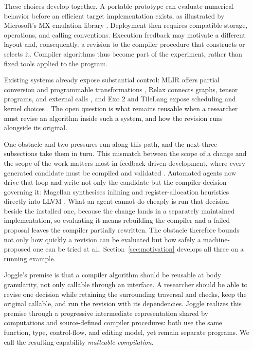 \documentclass[sigplan,anonymous,review]{acmart}
\begin{document}
These choices develop together. A portable prototype can evaluate numerical
behavior before an efficient target implementation exists, as illustrated by
Microsoft's MX emulation library \cite{microsoftMicroxcaling}. Deployment then
requires compatible storage, operations, and calling conventions. Execution
feedback may motivate a different layout and, consequently, a revision to the
compiler procedure that constructs or selects it. Compiler algorithms thus
become part of the experiment, rather than fixed tools applied to the program.

Existing systems already expose substantial control: MLIR offers partial
conversion and programmable transformations
\cite{mlirConversionDocs,lucke2025transform}, Relax connects graphs, tensor
programs, and external calls \cite{lai2025relax}, and Exo 2 and TileLang expose
scheduling and kernel choices \cite{ikarashi2024exo2,wang2025tilelang}. The
open question is what remains reusable when a researcher must revise an
algorithm inside such a system, and how the revision runs alongside its
original.

One obstacle and two pressures run along this path, and the next three
subsections take them in turn. This mismatch between the scope of a change and
the scope of the work matters most in feedback-driven development, where every
generated candidate must be compiled and validated
\cite{ouyang2025kernelbench}. Automated agents now drive that loop and write not
only the candidate but the compiler decision governing it: Magellan synthesises
inlining and register-allocation heuristics directly into LLVM
\cite{chen2026magellan,hong2025autocomp,mai2026argus}. What an agent cannot do
cheaply is run that decision beside the installed one, because the change lands
in a separately maintained implementation, so evaluating it means rebuilding the
compiler and a failed proposal leaves the compiler partially rewritten. The obstacle
therefore bounds not only how quickly a revision can be evaluated but how safely
a machine-proposed one can be tried at all. Section~\ref{sec:motivation}
develops all three on a running example.

Joggle's premise is that a compiler algorithm should be reusable at body
granularity, not only callable through an interface. A researcher should be
able to revise one decision while
retaining the surrounding traversal and checks, keep the original callable,
and run the revision with its dependencies. Joggle realizes this premise
through a progressive intermediate representation shared by computations and
source-defined compiler procedures: both use the same function, type,
control-flow, and editing model, yet remain separate programs. We call the
resulting capability \emph{malleable compilation}.
\end{document}
